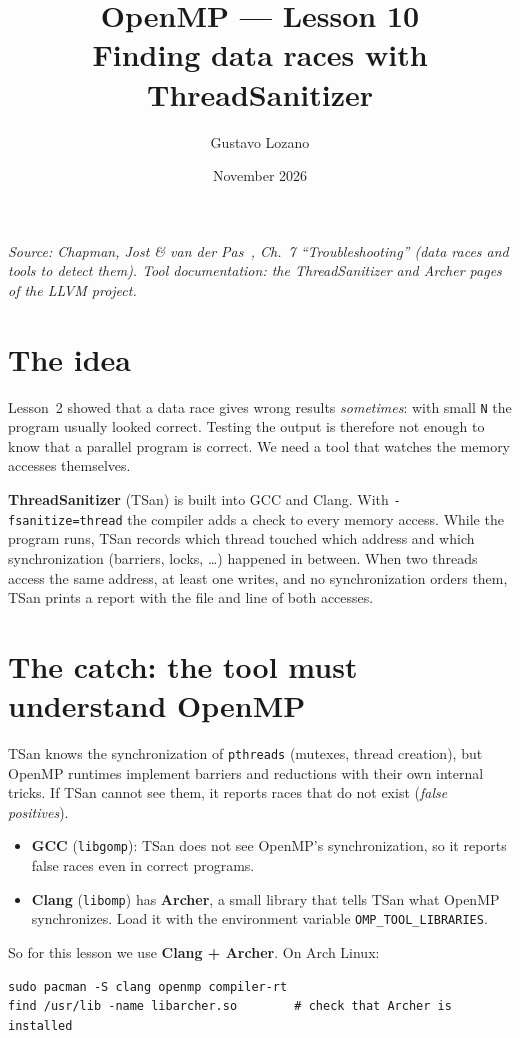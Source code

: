 \documentclass[11pt,a4paper]{article}
\title{\textbf{OpenMP --- Lesson 10}\\[4pt]\large Finding data races with ThreadSanitizer}
\author{Gustavo Lozano}
\date{November 2026}
\begin{document}
\maketitle

\noindent\textit{\small Source: Chapman, Jost \& van der Pas~\cite{chapman}, Ch.~7
``Troubleshooting'' (data races and tools to detect them). Tool documentation: the
ThreadSanitizer and Archer pages of the LLVM project.}

\section{The idea}
Lesson~2 showed that a data race gives wrong results \emph{sometimes}: with small
\texttt{N} the program usually looked correct. Testing the output is therefore not enough
to know that a parallel program is correct. We need a tool that watches the memory
accesses themselves.

\textbf{ThreadSanitizer} (TSan) is built into GCC and Clang. With
\texttt{-fsanitize=thread} the compiler adds a check to every memory access. While the
program runs, TSan records which thread touched which address and which synchronization
(barriers, locks, \ldots) happened in between. When two threads access the same address,
at least one writes, and no synchronization orders them, TSan prints a report with the
file and line of both accesses.

\section{The catch: the tool must understand OpenMP}
TSan knows the synchronization of \texttt{pthreads} (mutexes, thread creation), but
OpenMP runtimes implement barriers and reductions with their own internal tricks. If TSan
cannot see them, it reports races that do not exist (\emph{false positives}).
\begin{itemize}
  \item \textbf{GCC} (\texttt{libgomp}): TSan does not see OpenMP's synchronization, so it
        reports false races even in correct programs.
  \item \textbf{Clang} (\texttt{libomp}) has \textbf{Archer}, a small library that tells
        TSan what OpenMP synchronizes. Load it with the environment variable
        \texttt{OMP\_TOOL\_LIBRARIES}.
\end{itemize}
So for this lesson we use \textbf{Clang + Archer}. On Arch Linux:
\begin{lstlisting}[style=sh]
sudo pacman -S clang openmp compiler-rt
find /usr/lib -name libarcher.so        # check that Archer is installed
\end{lstlisting}
\end{document}
